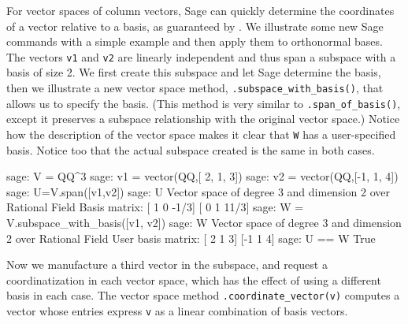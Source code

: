 For vector spaces of column vectors, Sage can quickly determine the coordinates of a vector relative to a basis, as guaranteed by .  We illustrate some new Sage commands with a simple example and then apply them to orthonormal bases.  The vectors \verb?v1? and \verb?v2? are linearly independent and thus span a subspace with a basis of size 2.  We first create this subspace and let Sage determine the basis, then we illustrate a new vector space method, \verb?.subspace_with_basis()?, that allows us to specify the basis.  (This method is very similar to \verb?.span_of_basis()?, except it preserves a subspace relationship with the original vector space.)  Notice how the description of the vector space makes it clear that \verb?W? has a user-specified basis.  Notice too that the actual subspace created is the same in both cases.
%
\begin{sageexample}
sage: V = QQ^3
sage: v1 = vector(QQ,[ 2, 1, 3])
sage: v2 = vector(QQ,[-1, 1, 4])
sage: U=V.span([v1,v2])
sage: U
Vector space of degree 3 and dimension 2 over Rational Field
Basis matrix:
[   1    0 -1/3]
[   0    1 11/3]
sage: W = V.subspace_with_basis([v1, v2])
sage: W
Vector space of degree 3 and dimension 2 over Rational Field
User basis matrix:
[ 2  1  3]
[-1  1  4]
sage: U == W
True
\end{sageexample}
%
Now we manufacture a third vector in the subspace, and request a coordinatization in each vector space, which has the effect of using a different basis in each case.  The vector space method \verb?.coordinate_vector(v)? computes a vector whose entries express \verb?v? as a linear combination of basis vectors.

